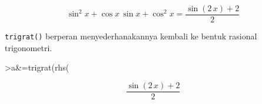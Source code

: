 \documentclass[a4paper,11pt,oneside,enabledeprecatedfontcommands]{scrbook}
\newenvironment{eulernotebook}{}{}
\newenvironment{eulercomment}{\par\medskip\noindent}{\par\medskip}
\newenvironment{eulerformula}{}{}
\begin{document}
\begin{eulernotebook}
\begin{eulercomment}
\end{eulercomment}
\begin{eulerformula}
\[
\sin ^2x+\cos x\,\sin x+\cos ^2x=\frac{\sin \left(2\,x\right)+2}{2}
\]
\end{eulerformula}
\begin{eulercomment}
\texttt{trigrat()} berperan menyederhanakannya kembali ke bentuk rasional trigonometri.
\end{eulercomment}
\begin{eulerprompt}
>a&=trigrat(rhs(%
\end{eulerprompt}
\begin{eulerformula}
\[
\frac{\sin \left(2\,x\right)+2}{2}
\]
\end{eulerformula}


\end{eulernotebook}
\end{document}
